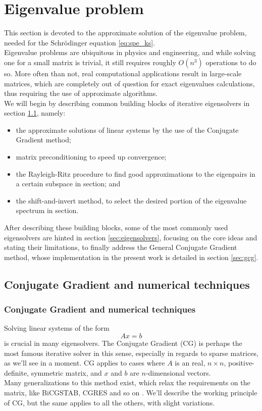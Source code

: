 \section{Eigenvalue problem}
This section is devoted to the approximate solution of the eigenvalue problem, needed for the Schr\"odinger equation \eqref{eq:spe_ks}. 
\\Eigenvalue problems are ubiquitous in physics and engineering, and while solving one for a small matrix is trivial, it still requires roughly $O(n^3)$ operations \cite{golub13} to do so. More often than not, real computational applications result in large-scale matrices, which are completely out of question for exact eigenvalues calculations, thus requiring the use of approximate algorithms. 
\\We will begin by describing common building blocks of iterative eigensolvers in section \ref{sec:techniques}, namely:
\begin{itemize}
    \item the approximate solutions of linear systems by the use of the Conjugate Gradient method;
    \item matrix preconditioning to speed up convergence;
    \item the Rayleigh-Ritz procedure to find good approximations to the eigenpairs in a certain subspace in section; and
    \item the shift-and-invert method, to select the desired portion of the eigenvalue spectrum in section.
\end{itemize}
After describing these building blocks, some of the most commonly used eigensolvers are hinted in section \ref{sec:eigensolvers}, focusing on the core ideas and stating their limitations, to finally address the General Conjugate Gradient method, whose implementation in the present work is detailed in section \ref{sec:gcg}.
\subsection{Conjugate Gradient and numerical techniques}
\label{sec:techniques}
\subsubsection{Conjugate Gradient and numerical techniques}
\label{sec:cg}
Solving linear systems of the form
\begin{equation}
    \label{eq:lin_sys}
    Ax = b
\end{equation}
is crucial in many eigensolvers. The Conjugate Gradient (CG) is perhaps the most famous iterative solver in this sense, especially in regards to sparse matrices, as we'll see in a moment.
CG applies to cases where $A$ is an real, $n\times n$, positive-definite, symmetric matrix, and $x$ and $b$ are $n$-dimensional vectors.
\\Many generalizations to this method exist, which relax the requirements on the matrix, like BiCGSTAB, CGRES and so on \cite{Saad1992}. We'll describe the working principle of CG, but the same applies to all the others, with slight variations.
